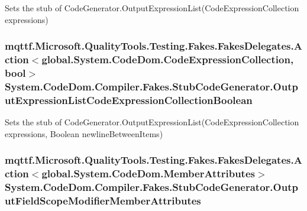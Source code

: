 Sets the stub of Code\-Generator.\-Output\-Expression\-List(\-Code\-Expression\-Collection expressions)

\hypertarget{class_system_1_1_code_dom_1_1_compiler_1_1_fakes_1_1_stub_code_generator_a5fbd85a502e089da92e9d33ee84b2e33}{
\subsubsection[{Output\-Expression\-List\-Code\-Expression\-Collection\-Boolean}]{\setlength{\rightskip}{0pt plus 5cm}mqttf.\-Microsoft.\-Quality\-Tools.\-Testing.\-Fakes.\-Fakes\-Delegates.\-Action$<$global.\-System.\-Code\-Dom.\-Code\-Expression\-Collection, bool$>$ System.\-Code\-Dom.\-Compiler.\-Fakes.\-Stub\-Code\-Generator.\-Output\-Expression\-List\-Code\-Expression\-Collection\-Boolean}}\label{class_system_1_1_code_dom_1_1_compiler_1_1_fakes_1_1_stub_code_generator_a5fbd85a502e089da92e9d33ee84b2e33}


Sets the stub of Code\-Generator.\-Output\-Expression\-List(\-Code\-Expression\-Collection expressions, Boolean newline\-Between\-Items)

\hypertarget{class_system_1_1_code_dom_1_1_compiler_1_1_fakes_1_1_stub_code_generator_a9ddb9885e6776bd318e3784feaf9d912}{
\subsubsection[{Output\-Field\-Scope\-Modifier\-Member\-Attributes}]{\setlength{\rightskip}{0pt plus 5cm}mqttf.\-Microsoft.\-Quality\-Tools.\-Testing.\-Fakes.\-Fakes\-Delegates.\-Action$<$global.\-System.\-Code\-Dom.\-Member\-Attributes$>$ System.\-Code\-Dom.\-Compiler.\-Fakes.\-Stub\-Code\-Generator.\-Output\-Field\-Scope\-Modifier\-Member\-Attributes}}\label{class_system_1_1_code_dom_1_1_compiler_1_1_fakes_1_1_stub_code_generator_a9ddb9885e6776bd318e3784feaf9d912}



